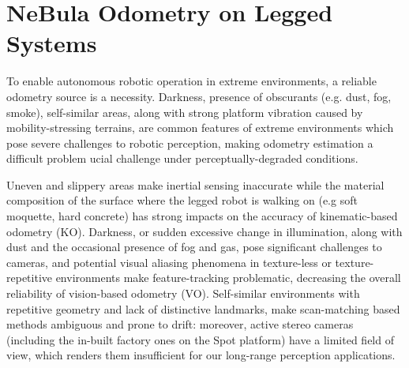 \documentclass[letterpaper, 10pt, conference]{ieeeconf}      %
\newcommand{\ph}[1]{{\textbf{#1}:}} %
\newcommand{\rev}[1]{{\color{blue}#1}} %
\begin{document}









\section{NeBula Odometry on Legged Systems}\label{sec:state_estimation}
To enable autonomous robotic operation in extreme environments, a reliable odometry source is \rev{a necessity.} %
Darkness, presence of obscurants (e.g. dust, fog, smoke), self-similar areas, along with strong platform vibration caused by mobility-stressing terrains, are common features \rev{of extreme environments} which pose severe challenges to robotic perception, making odometry estimation a \rev{difficult problem} %
ucial challenge 
under perceptually-degraded conditions.

Uneven and slippery areas make inertial sensing inaccurate while the material composition of the surface where the legged robot is walking on (e.g soft moquette, hard concrete) has strong impacts on the accuracy of kinematic-based odometry (KO). Darkness, or sudden excessive change in illumination, along with dust and the occasional presence of fog and gas, pose significant challenges to cameras, and potential visual aliasing phenomena in texture-less or texture-repetitive environments make feature-tracking problematic, decreasing the overall reliability of vision-based odometry (VO). Self-similar environments with repetitive geometry and lack of distinctive landmarks, make scan-matching based methods ambiguous and prone to drift: moreover, active stereo cameras (including the in-built factory ones on the Spot platform) have a limited field of view, which renders them insufficient for our long-range perception applications.
\end{document}
